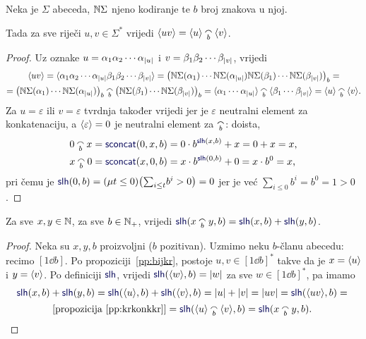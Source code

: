 \begin{propozicija}[{name=[prateća funkcija konkatenacije nad $\Sigma$]}]\label{pp:krkonkkr}
Neka je $\Sigma$ abeceda, ${\mathbb N}\Sigma$ njeno kodiranje te $b$ broj znakova u njoj.
	
	Tada za sve riječi $u,v\in\Sigma^*$ vrijedi
    $\kr{uv}=\kr u\conc b\kr v$.
\end{propozicija}
\begin{proof}
Uz oznake $u=\alpha_1\alpha_2\dotsm\alpha_{\lvert u\rvert}$ i $v=\beta_1\beta_2\dotsm\beta_{\lvert v\rvert}$, vrijedi
\begin{multline*}
\kr{uv}=\kr{\alpha_1\alpha_2\dotsm\alpha_{\dulj u}\beta_1\beta_2\dotsm\beta_{\dulj v}}=\bigl(
\N\Sigma(\alpha_1)
\dotsm
\N\Sigma(\alpha_{\dulj u})
\N\Sigma(\beta_1)
\dotsm
\N\Sigma(\beta_{\dulj v})
\bigr)_b=\\
=\bigl(
\N\Sigma(\alpha_1)
\dotsm
\N\Sigma(\alpha_{\dulj u})
\bigr)_b\conc b\bigl(
\N\Sigma(\beta_1)
\dotsm
\N\Sigma(\beta_{\dulj v})
\bigr)_b=\kr{\alpha_1\dotsm\mspace{1mu}\alpha_{\dulj u}}\conc b\kr{\beta_1\dotsm\mspace{1mu}\beta_{\dulj v}}=\kr u\conc b\kr v\text.
\end{multline*}
Za $u=\varepsilon$ ili $v=\varepsilon$ tvrdnja također vrijedi jer je $\varepsilon$ neutralni element za konkatenaciju, a $\langle\varepsilon\rangle=0$ je neutralni element za $\conc b$: doista,
\begin{align}
    0\conc bx&=\f{sconcat}(0,x,b)=0\cdot b^{\f{slh}(x,b)}+x=0+x=x\text,\\
    x\conc b0&=\f{sconcat}(x,0,b)=x\cdot b^{\f{slh}(0,b)}+0=x\cdot b^0=x\text,
\end{align}
pri čemu je $\f{slh}(0,b)=(\mu t\le 0)\bigl(\sum_{i\le t}\!b^i>0\bigr)=0$ jer je već $\sum_{i\le0}b^i=b^0=1>0$.
\end{proof}

\begin{korolar}[{name=[duljina konkatenacije je zbroj duljina]}]\label{kor:lhkonk=lh+lh}
Za sve $x,y\in{\mathbb N}$, za sve $b\in{\mathbb N}_+$, vrijedi $\f{slh}(x\conc b y,b)=\f{slh}(x,b)+\f{slh}(y,b)$.
\end{korolar}
\begin{proof}
Neka su $x,y,b$ proizvoljni ($b$ pozitivan). Uzmimo neku $b$-članu abecedu: recimo $[1\dd b]$.
    Po propoziciji~\ref{pp:bijkr}, postoje $u,v\in[1\dd b]^*$ takve da je $x=\langle u\rangle$ i $y=\langle v\rangle$. Po definiciji $\f{slh}$, vrijedi $\f{slh}(\kr w,b)=\dulj w$ za sve $w\in[1\dd b]^*$, pa imamo
\begin{multline}
    \f{slh}(x,b)+\f{slh}(y,b)=
    \f{slh}(\kr u,b)+\f{slh}(\kr v,b)=
    \dulj u+\dulj v=
    \dulj{uv}=
    \f{slh}(\kr{uv},b)={}\\
    \text{[propozicija \ref{pp:krkonkkr}]}{}=\f{slh}(\kr u\conc b\kr v,b)=
    \f{slh}(x\conc b y,b)\text{.\;\qedhere}
\end{multline}
\end{proof}

